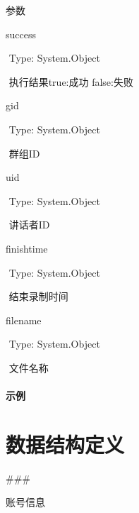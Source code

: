 \documentclass[letterpaper,10pt,english]{sphinxmanual}
\begin{document}
参数

success

​ Type: System.Object

​ 执行结果true:成功 false:失败

gid

​ Type: System.Object

​ 群组ID

uid

​ Type: System.Object

​ 讲话者ID

finishtime

​ Type: System.Object

​ 结束录制时间

filename

​ Type: System.Object

​ 文件名称


\paragraph{示例}
\label{\detokenize{csharp_activex:id161}}
%
\begin{sphinxVerbatim}[commandchars=\\\{\}]
    

\end{sphinxVerbatim}


\section{数据结构定义}
\label{\detokenize{csharp_activex:id162}}
\#\#\#



账号信息
\end{document}
